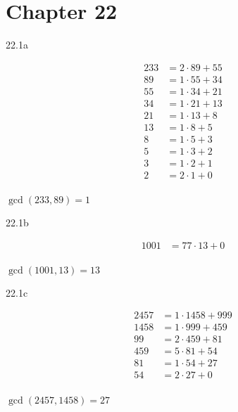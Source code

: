    \section*{Chapter 22}
    
\begin{Solution}{22.1a}

\begin{align*}
 233 &= 2\cdot89+55 \\
 89 &= 1\cdot55+34 \\
  55 &= 1\cdot34+21 \\
  34 &= 1\cdot21+13\\
  21  &= 1\cdot13+8 \\
  13  &= 1\cdot8+5 \\
  8  &= 1\cdot5+3 \\
  5  &= 1\cdot3+2 \\
  3  &= 1\cdot2+1 \\
  2  &= 2\cdot1+0 \\
  \end{align*}
 
$\gcd(233,89) = 1$



\end{Solution}

\begin{Solution}{22.1b}


\begin{align*}
 1001 &= 77\cdot13+0 \\
 \end{align*}
 
$\gcd(1001,13) = 13$

\end{Solution}

\begin{Solution}{22.1c}


\begin{align*}
 2457 &= 1\cdot 1458+999 \\
 1458 &= 1\cdot999+ 459 \\
  99 &= 2\cdot459+81 \\
  459 &= 5\cdot81+54 \\
  81  &= 1\cdot54+27 \\
  54  &= 2\cdot27+0 \\
  \end{align*}

$\gcd(2457,1458) = 27$

\end{Solution}

